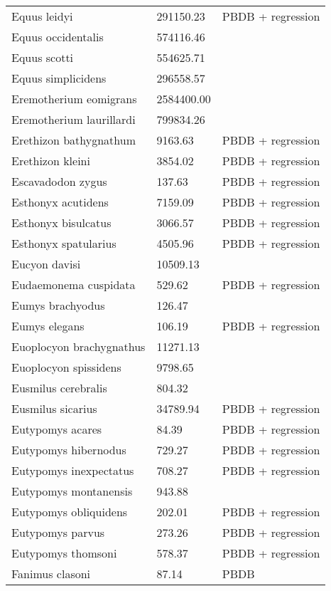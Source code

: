 \begin{center}
\begin{longtable}{p{} p{} p{} }
  Equus leidyi & 291150.23 & PBDB + regression \\ 
  Equus occidentalis & 574116.46 & \cite{Smith2004} \\ 
  Equus scotti & 554625.71 & \cite{Smith2004} \\ 
  Equus simplicidens & 296558.57 & \cite{Tomiya2013} \\ 
  Eremotherium eomigrans & 2584400.00 & \cite{McDonald2005} \\ 
  Eremotherium laurillardi & 799834.26 & \cite{Smith2004} \\ 
  Erethizon bathygnathum & 9163.63 & PBDB + regression \\ 
  Erethizon kleini & 3854.02 & PBDB + regression \\ 
  Escavadodon zygus & 137.63 & PBDB + regression \\ 
  Esthonyx acutidens & 7159.09 & PBDB + regression \\ 
  Esthonyx bisulcatus & 3066.57 & PBDB + regression \\ 
  Esthonyx spatularius & 4505.96 & PBDB + regression \\ 
  Eucyon davisi & 10509.13 & \cite{Tomiya2013} \\ 
  Eudaemonema cuspidata & 529.62 & PBDB + regression \\ 
  Eumys brachyodus & 126.47 & \cite{Tomiya2013} \\ 
  Eumys elegans & 106.19 & PBDB + regression \\ 
  Euoplocyon brachygnathus & 11271.13 & \cite{Tomiya2013} \\ 
  Euoplocyon spissidens & 9798.65 & \cite{Tomiya2013} \\ 
  Eusmilus cerebralis & 804.32 & \cite{Tomiya2013} \\ 
  Eusmilus sicarius & 34789.94 & PBDB + regression \\ 
  Eutypomys acares & 84.39 & PBDB + regression \\ 
  Eutypomys hibernodus & 729.27 & PBDB + regression \\ 
  Eutypomys inexpectatus & 708.27 & PBDB + regression \\ 
  Eutypomys montanensis & 943.88 & \cite{Tomiya2013} \\ 
  Eutypomys obliquidens & 202.01 & PBDB + regression \\ 
  Eutypomys parvus & 273.26 & PBDB + regression \\ 
  Eutypomys thomsoni & 578.37 & PBDB + regression \\ 
  Fanimus clasoni & 87.14 & PBDB \\ 

\end{longtable}
\end{center}
